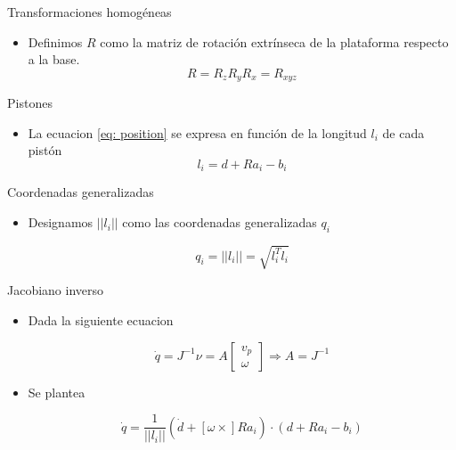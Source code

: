 \documentclass{beamer}
\begin{document}
\begin{frame}{Transformaciones homogéneas}
\begin{itemize}
 \item Definimos $R$ como la matriz de rotación extrínseca de la plataforma respecto a la base. \\
 \begin{equation}
R = R_zR_yR_x = R_{xyz}
\end{equation}
\end{itemize}
\end{frame}

\begin{frame}{Pistones}
\begin{itemize}
 \item La ecuacion \ref{eq: position} se expresa en función de la longitud $l_i$ de cada pistón
 \begin{equation}
  l_i = d + Ra_i - b_i
 \end{equation}
\end{itemize}

\end{frame}

\begin{frame}{Coordenadas generalizadas}
 \begin{itemize}
  \item Designamos $||l_i||$ como las coordenadas generalizadas $q_i$
  
  \begin{equation}\label{eq_coordgral}
q_i = ||l_i|| = \sqrt{l_i^Tl_i}
\end{equation}
  
 \end{itemize}

\end{frame}


\begin{frame}{Jacobiano inverso}
\begin{itemize}
 \item Dada la siguiente ecuacion
 
 \begin{equation}
\dot{q}=J^{-1} \nu = A \begin{bmatrix}
v_p\\
\omega
\end{bmatrix} \Rightarrow A = J^{-1}
\end{equation}

\item Se plantea

\begin{equation}
\dot{q}=\frac{1}{||l_i||}(\dot{d} + [\omega \times] Ra_i)\cdot(d + Ra_i -b_i) 
\end{equation}

\end{itemize}

 
\end{frame}
\end{document}
